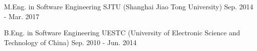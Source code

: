 \documentclass[11pt, a4paper, UTF8]{awesome-cv}
\begin{document}
\begin{cventries}
    
\end{cventries}



%
\begin{cventries}
  \cventry
    {M.Eng. in Software Engineering} %
    {SJTU (Shanghai Jiao Tong University)} %
    {Sep. 2014 - Mar. 2017} %
    {\ } %
    {\ }

  \cventry
    {B.Eng. in Software Engineering} %
    {UESTC (University of Electronic Science and Technology of China)} %
    {Sep. 2010 - Jun. 2014} %
    {\ } %
    {\ }
    
\end{cventries}
\end{document}
